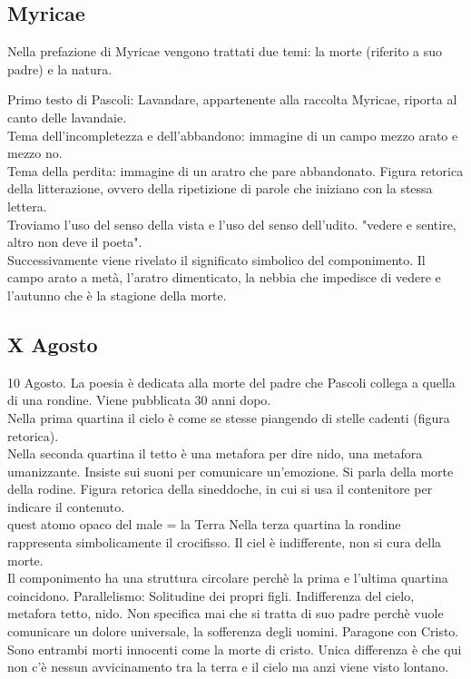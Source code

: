 \documentclass{article}
\begin{document}
\subsection{Myricae}
Nella prefazione di Myricae vengono trattati due temi: la morte (riferito a suo padre) e la natura.

Primo testo di Pascoli: Lavandare, appartenente alla raccolta Myricae, riporta al canto delle lavandaie.\\
Tema dell'incompletezza e dell'abbandono: immagine di un campo mezzo arato e mezzo no.\\
Tema della perdita: immagine di un aratro che pare abbandonato. Figura retorica della litterazione, ovvero della
ripetizione di parole che iniziano con la stessa lettera.\\
Troviamo l'uso del senso della vista e l'uso del senso dell'udito. "vedere e sentire, altro non deve il poeta".\\
Successivamente viene rivelato il significato simbolico del componimento. Il campo arato a metà, l'aratro dimenticato,
la nebbia che impedisce di vedere e l'autunno che è la stagione della morte.

\subsection{X Agosto}
10 Agosto. La poesia è dedicata alla morte del padre che Pascoli collega a quella di una rondine. Viene pubblicata 30 anni dopo.\\
Nella prima quartina il cielo è come se stesse piangendo di stelle cadenti (figura retorica).\\
Nella seconda quartina il tetto è una metafora per dire nido, una metafora umanizzante. Insiste sui suoni per comunicare
un'emozione. Si parla della morte della rodine. Figura retorica della sineddoche, in cui si usa il contenitore per indicare
il contenuto.\\
quest atomo opaco del male = la Terra
Nella terza quartina la rondine rappresenta simbolicamente il crocifisso. Il ciel è indifferente, non si cura della morte.\\
Il componimento ha una struttura circolare perchè la prima e l'ultima quartina coincidono.
Parallelismo: Solitudine dei propri figli. Indifferenza del cielo, metafora tetto, nido. Non specifica mai che si tratta di
suo padre perchè vuole comunicare un dolore universale, la sofferenza degli uomini. Paragone con Cristo. Sono entrambi
morti innocenti come la morte di cristo. Unica differenza è che qui non c'è nessun avvicinamento tra la terra e il cielo ma
anzi viene visto lontano.
\end{document}
